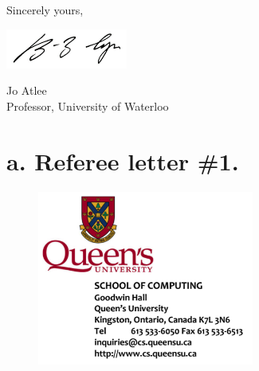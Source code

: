 \documentclass[10pt]{article}
\begin{document}
Sincerely yours,

\includegraphics[width=4cm]{msig.png} %



Jo Atlee\\
Professor, University of Waterloo


\newpage
\section{a. Referee letter \#1.}

\begin{figure}
\vspace{-.6in}
\includegraphics[width=2.8in]{img/aheader.png}
\vspace{-.7in}
\end{figure}
\end{document}
